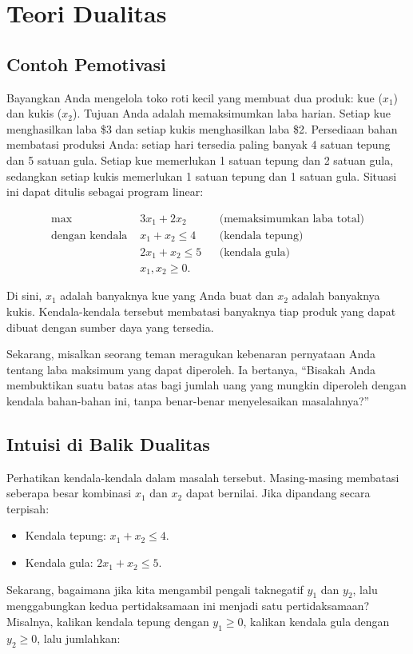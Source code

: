 \section{Teori Dualitas}
\label{sec:duality-theory}

\subsection*{Contoh Pemotivasi}

Bayangkan Anda mengelola toko roti kecil yang membuat dua produk: kue ($x_1$) dan kukis ($x_2$). Tujuan Anda adalah memaksimumkan laba harian. Setiap kue menghasilkan laba \$3 dan setiap kukis menghasilkan laba \$2. Persediaan bahan membatasi produksi Anda: setiap hari tersedia paling banyak 4 satuan tepung dan 5 satuan gula. Setiap kue memerlukan 1 satuan tepung dan 2 satuan gula, sedangkan setiap kukis memerlukan 1 satuan tepung dan 1 satuan gula. Situasi ini dapat ditulis sebagai program linear:

\[
\begin{aligned}
\max \; & 3x_1 + 2x_2 && \text{(memaksimumkan laba total)}\\
\text{dengan kendala } & x_1 + x_2 \leq 4 && \text{(kendala tepung)}\\
& 2x_1 + x_2 \leq 5 && \text{(kendala gula)}\\
& x_1, x_2 \geq 0.
\end{aligned}
\]

Di sini, $x_1$ adalah banyaknya kue yang Anda buat dan $x_2$ adalah banyaknya kukis. Kendala-kendala tersebut membatasi banyaknya tiap produk yang dapat dibuat dengan sumber daya yang tersedia.

Sekarang, misalkan seorang teman meragukan kebenaran pernyataan Anda tentang laba maksimum yang dapat diperoleh. Ia bertanya, ``Bisakah Anda membuktikan suatu batas atas bagi jumlah uang yang mungkin diperoleh dengan kendala bahan-bahan ini, tanpa benar-benar menyelesaikan masalahnya?''

\subsection*{Intuisi di Balik Dualitas}

Perhatikan kendala-kendala dalam masalah tersebut. Masing-masing membatasi seberapa besar kombinasi $x_1$ dan $x_2$ dapat bernilai. Jika dipandang secara terpisah:

\begin{itemize}
\item Kendala tepung: $x_1 + x_2 \leq 4$.
\item Kendala gula: $2x_1 + x_2 \leq 5$.
\end{itemize}
Sekarang, bagaimana jika kita mengambil pengali taknegatif $y_1$ dan $y_2$, lalu menggabungkan kedua pertidaksamaan ini menjadi satu pertidaksamaan? Misalnya, kalikan kendala tepung dengan $y_1 \geq 0$, kalikan kendala gula dengan $y_2 \geq 0$, lalu jumlahkan:

